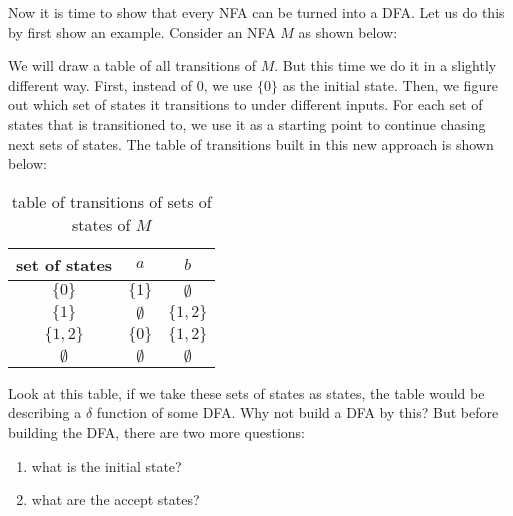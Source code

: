 \documentclass[11pt]{article}
\begin{document}
Now it is time to show that every NFA can be turned into a DFA. Let us do this by first
show an example. Consider an NFA $M$ as shown below:

\begin{figure}[ht]
    \centering
    \caption{}
    \label{fig:fig14}
\end{figure}

We will draw a table of all transitions of $M$. But this time we do it in a slightly
different way. First, instead of $0$, we use $\{0\}$ as the initial state. Then, we
figure out which set of states it transitions to under different inputs. For each
set of states that is transitioned to, we use it as a starting point to continue
chasing next sets of states. The table of transitions built in this new approach is
shown below:

\begin{table}[h!]
\centering
\begin{tabular}{|c|c|c|}
\hline
set of states & $a$ & $b$ \\
\hline
$\{0\}$ & $\{1\}$ & $\emptyset$ \\
\hline
$\{1\}$ & $\emptyset$ & $\{1,2\}$ \\
\hline
$\{1,2\}$ & $\{0\}$ & $\{1,2\}$ \\
\hline
$\emptyset$ & $\emptyset$ & $\emptyset$ \\
\hline
\end{tabular}
\caption{table of transitions of sets of states of $M$}
\end{table}

Look at this table, if we take these sets of states as states, the table would be
describing a $\delta$ function of some DFA. Why not build a DFA by this? But before
building the DFA, there are two more questions:
\begin{enumerate}
\item what is the initial state?
\item what are the accept states?
\end{enumerate}
\end{document}
